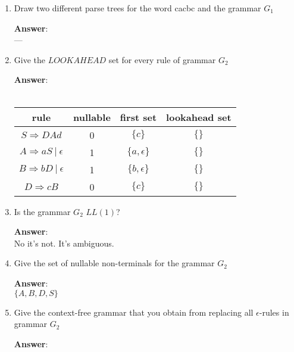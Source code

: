\documentclass[a4paper, 14pt]{report}
\newcommand{\answer}[1]{%
	\textbf{Answer}:\\
	#1}
\begin{document}
\begin{enumerate}[label=(\alph*)]

		\setlength\itemsep{2em}

	\item Draw two different parse trees for the word cacbc and the grammar $G_{1}$

		\answer{%
			---
		}

	\item Give the $LOOKAHEAD$ set for every rule of grammar $G_{2}$



		\answer{%
			\\
			\begin{tabular}{ |c|c|c|c| } 
				\hline
				rule & nullable & first set & lookahead set \\
				\hline
				\[ S \Rightarrow DAd \] & 0 & $\{c\}$ & $\{\}$ \\
				\hline
				\[ A \Rightarrow aS\ |\ \epsilon \] & 1  & $\{a, \epsilon\}$ & $\{\}$ \\
				\hline
				\[ B \Rightarrow bD\ |\ \epsilon \] & 1 & $\{b, \epsilon\}$ & $\{\}$ \\
				\hline
				\[ D \Rightarrow cB \] & 0  & $\{c\}$ & $\{\}$ \\
				\hline
			\end{tabular}
		}

	\item Is the grammar $G_{2}$ $LL(1)$?

		\answer{No it's not. It's ambiguous.}

	\item Give the set of nullable non-terminals for the grammar $G_{2}$


		\answer{$\{A, B, D, S\}$}

	\item Give the context-free grammar that you obtain from replacing all $\epsilon$-rules in grammar $G_{2}$

		\answer{%

			\begin{multicols}{2}


\end{multicols}}
\end{enumerate}
\end{document}
